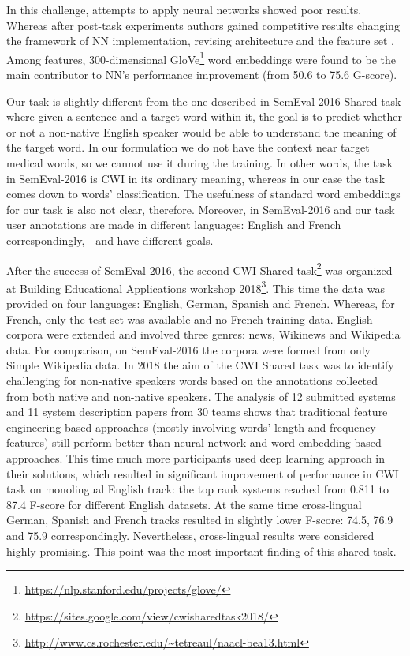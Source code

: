 In this challenge, attempts to apply neural networks showed poor results. Whereas after post-task experiments authors gained competitive results changing the framework of NN implementation, revising architecture and the feature set \citep{Bingel-SemEval2016}. Among features, 300-dimensional GloVe\footnote{\url{https://nlp.stanford.edu/projects/glove/}} word embeddings were found to be the main contributor to NN's performance improvement (from 50.6 to 75.6 G-score). 

Our task is slightly different from the one described in SemEval-2016 Shared task \citep{Paetzold-SemEval2016overview} where given a sentence and a target word within it, the goal is to predict whether or not a non-native English speaker would be able to understand the meaning of the target word. In our formulation we do not have the context near target medical words, so we cannot use it during the training. In other words, the task in SemEval-2016 is CWI in its ordinary meaning, whereas in our case the task comes down to words' classification. The usefulness of standard word embeddings for our task is also not clear, therefore. Moreover, in SemEval-2016 and our task user annotations are made in different languages: English and French correspondingly, -  and have different goals.

After the success of SemEval-2016, the second CWI Shared task\footnote{\url{https://sites.google.com/view/cwisharedtask2018/}} was organized at Building Educational Applications workshop 2018\footnote{\url{http://www.cs.rochester.edu/~tetreaul/naacl-bea13.html}}. This time the data was provided on four languages: English, German, Spanish and French. Whereas, for French, only the test set was available and no French training data. English corpora were extended and involved three genres: news, Wikinews and Wikipedia data. For comparison, on SemEval-2016 the corpora were formed from only Simple Wikipedia data. In 2018 the aim of the CWI Shared
task was to identify challenging for non-native speakers words based on the annotations collected from both native and non-native speakers. 
The analysis \citep{Yimam-BEA2018} of 12 submitted systems and 11 system description papers from 30 teams shows that traditional feature engineering-based approaches (mostly involving words' length and frequency features) still perform better than neural network and word embedding-based approaches. This time much more participants used deep learning approach in their solutions, which resulted in significant improvement of performance in CWI task on monolingual English track: the top rank systems reached from 0.811 to 87.4 F-score for different English datasets. At the same time cross-lingual German, Spanish and French tracks resulted in slightly lower F-score: 74.5, 76.9 and 75.9 correspondingly. Nevertheless, cross-lingual results were considered highly promising. This point was the most important finding of this shared task. 

